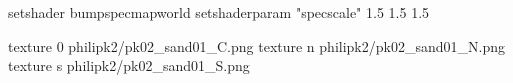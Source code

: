 setshader bumpspecmapworld
setshaderparam "specscale" 1.5 1.5 1.5

texture 0 philipk2/pk02_sand01_C.png
texture n philipk2/pk02_sand01_N.png
texture s philipk2/pk02_sand01_S.png

